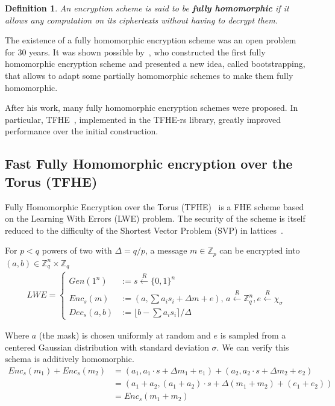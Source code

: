 \documentclass{article}
\newtheorem{definition}{Definition}
\begin{document}
\begin{definition}
    An encryption scheme is said to be \textbf{fully homomorphic} if it allows any computation on its ciphertexts without having to decrypt them.
\end{definition}

The existence of a fully homomorphic encryption scheme was an open problem for 30 years. It was shown possible by~\cite{gentry_fully_2009}, who constructed the first fully homomorphic encryption scheme and presented a new idea, called bootstrapping, that allows to adapt some partially homomorphic schemes to make them fully homomorphic.

After his work, many fully homomorphic encryption schemes were proposed. In particular, TFHE~\cite{chillotti_tfhe_2020}, implemented in the TFHE-rs library, greatly improved performance over the initial construction.

\subsection{Fast Fully Homomorphic encryption over the Torus (TFHE)}

Fully Homomorphic Encryption over the Torus (TFHE)~\cite{chillotti_tfhe_2020} is a FHE scheme based on the Learning With Errors (LWE) problem. The security of the scheme is itself reduced to the difficulty of the Shortest Vector Problem (SVP) in lattices~\cite{regev_lattices_2009}.

For $p < q$ powers of two with $\Delta = q / p$, a message $m \in \mathbb{Z}_p$ can be encrypted into $(a, b) \in \mathbb{Z}_q^n \times \mathbb{Z}_q$
\begin{align*}
    LWE = \begin{cases}
        Gen(1^n) &:= s \overset{R}{\gets} {\{0, 1\}}^n \\
        Enc_s(m) &:= (a, \sum{a_i s_i} + \Delta m + e),\, a \overset{R}{\gets} \mathbb{Z}_q^n, e \overset{R}{\gets} \chi_\sigma \\
        Dec_s(a, b) &:= \lfloor b - \sum{a_i s_i} \rceil  / \Delta
    \end{cases}
\end{align*}

Where $a$ (the mask) is chosen uniformly at random and $e$ is sampled from a centered Gaussian distribution with standard deviation $\sigma$. We can verify this schema is additively homomorphic.
\begin{align*}
    Enc_s(m_1) + Enc_s(m_2) & = (a_1, a_1 \cdot s + \Delta m_1 + e_1) + (a_2, a_2 \cdot s + \Delta m_2 + e_2) \\
    &= (a_1 + a_2, (a_1 + a_2) \cdot s + \Delta (m_1 + m_2) + (e_1 + e_2)) \\
    &= Enc_s(m_1 + m_2)
\end{align*}
\end{document}
